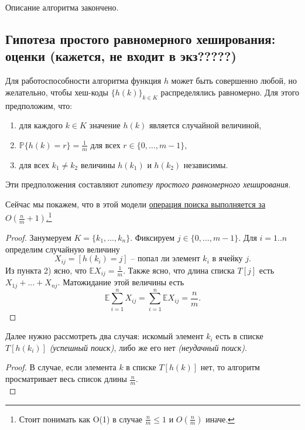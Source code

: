 Описание алгоритма закончено. 

\subsection{Гипотеза простого равномерного хеширования: оценки (кажется, не входит в экз?????)}

Для работоспособности алгоритма функция $h$ может быть совершенно любой, но желательно, чтобы хеш-коды $\{h(k)\}_{k\in K}$ распределялись равномерно. Для этого предположим, что:
\begin{enumerate}
    \item для каждого $k \in K$ значение $h(k)$ является случайной величиной, 
    \item $\mathbb P\{h(k) = r\} = \frac{1}{m}$ для всех $r \in \{0, \ldots, m-1\}$,
    \item для всех $k_1 \neq k_2$ величины $h(k_1)$ и $h(k_2)$ независимы.
\end{enumerate}
Эти предположения составляют \textit{гипотезу простого равномерного хеширования}.

Сейчас мы покажем, что в этой модели \underline{операция поиска выполняется за $O(\frac{n}{m}+1)$.}\footnote{Стоит понимать как O(1) в случае $\frac{n}{m} \leq 1$ и $O(\frac{n}{m})$ иначе.}

\begin{proof}
Занумеруем $K = \{k_1, ..., k_n\}$. Фиксируем $j \in \{0, \ldots, m-1\}$. Для $i=1..n$ определим случайную величину 
$$X_{ij} = [h(k_i)=j] \text{ -- попал ли элемент $k_i$ в ячейку $j$.}$$ 
Из пункта 2) ясно, что $\mathbb E X_{ij} = \frac{1}{m}$. Также ясно, что длина списка $T[j]$ есть $X_{1j}+...+X_{nj}$. Матожидание этой величины есть $$\mathbb E \sum_{i=1}^n X_{ij} = \sum_{i=1}^n \mathbb E X_{ij} = \frac{n}{m}.$$ 
\end{proof}

Далее нужно рассмотреть два случая: искомый элемент $k_i$ есть в списке $T[h(k_i)]$ \textit{(успешный поиск)}, либо же его нет \textit{(неудачный поиск)}.

\begin{proof}
В случае, если элемента $k$ в списке $T[h(k)]$ нет, то алгоритм просматривает весь список длины $\frac{n}{m}$. \\ 
\end{proof}

